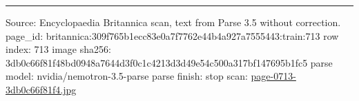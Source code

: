 \documentclass[10pt]{article}
\begin{document}
\vfill\par\noindent\rule{\linewidth}{0.4pt}\par
{\scriptsize\color{gray}\noindent Source: Encyclopaedia Britannica scan, text from Parse 3.5 without correction. page\_id: britannica:309f765b1ecc83e0a7f7762e44b4a927a7555443:train:713 \quad row index: 713 \quad image sha256: 3db0c66f81f48bd0948a7644d3f0c1c4213d3d49e54c500a317bf147695b1fc5 \quad parse model: nvidia/nemotron-3.5-parse \quad parse finish: stop \quad scan: \href{../scans/page-0713-3db0c66f81f4.jpg}{page-0713-3db0c66f81f4.jpg}\par}
\end{document}
